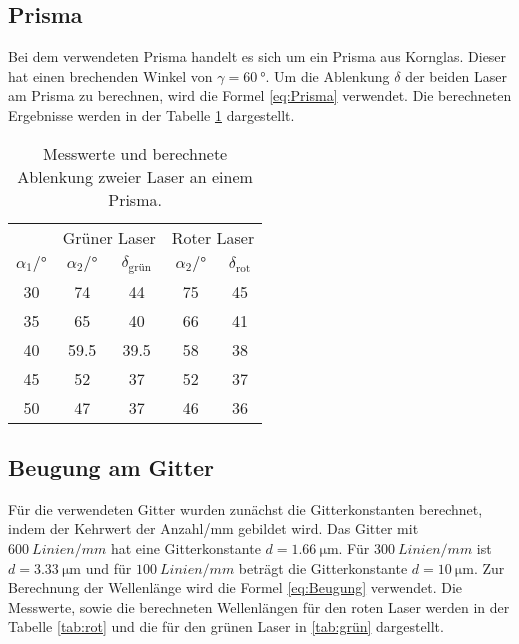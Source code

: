 \subsection{Prisma}

Bei dem verwendeten Prisma handelt es sich um ein Prisma aus Kornglas.
Dieser hat einen brechenden Winkel von $\gamma = \qty{60}{°}$.
Um die Ablenkung $\delta$ der beiden Laser am Prisma zu berechnen, wird die Formel \ref{eq:Prisma} verwendet.
Die berechneten Ergebnisse werden in der Tabelle \ref{tab:Prisma} dargestellt.

\begin{table}[H]
  \centering
  \caption{Messwerte und berechnete Ablenkung zweier Laser an einem Prisma.}
  \label{tab:Prisma}
  \begin{tabular}{c c c c c}
    \toprule
  & \multicolumn{2}{c}{Grüner Laser} & \multicolumn{2}{c}{Roter Laser} \\
\cmidrule(lr){2-3}\cmidrule(lr){4-5}
    $\alpha_1 / °$ & $\alpha_2  /° $ & $\delta_\text{grün}$ &  $\alpha_2  /°$ & $\delta_\text{rot}$ \\
    \midrule
    30 & 74    & 44   & 75 & 45 \\  
    35 & 65    & 40   & 66 & 41 \\    
    40 & 59.5  & 39.5 & 58 & 38 \\  
    45 & 52    & 37   & 52 & 37 \\  
    50 & 47    & 37   & 46 & 36 \\   
    \bottomrule
  \end{tabular}
\end{table}


\subsection{Beugung am Gitter}

Für die verwendeten Gitter wurden zunächst die Gitterkonstanten berechnet, indem der Kehrwert der Anzahl/mm gebildet wird.
Das Gitter mit $\qty{600}{Linien/mm}$ hat eine Gitterkonstante $d = \qty{1.66}{\micro\metre} $.
Für $\qty{300}{Linien/mm}$ ist $d = \qty{3.33}{\micro\metre}$ und für $\qty{100}{Linien/mm}$ beträgt die Gitterkonstante $d = \qty{10}{\micro\metre}$.
Zur Berechnung der Wellenlänge wird die Formel \ref{eq:Beugung} verwendet.
Die Messwerte, sowie die berechneten Wellenlängen für den roten Laser werden in der Tabelle \ref{tab:rot} und die für den grünen Laser in \ref{tab:grün} dargestellt.

